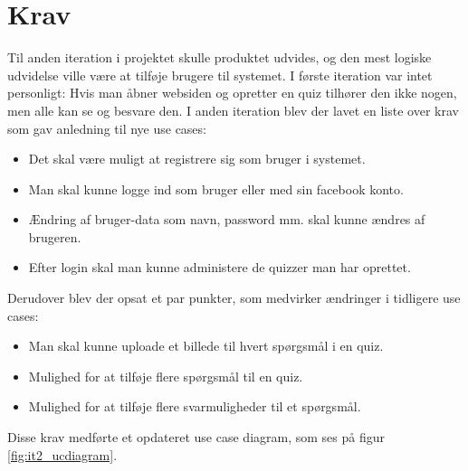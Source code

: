 \section{Krav}
Til anden iteration i projektet skulle produktet udvides, og den mest logiske udvidelse ville være at tilføje brugere til systemet. I første iteration var intet personligt: Hvis man åbner websiden og opretter en quiz tilhører den ikke nogen, men alle kan se og besvare den.
I anden iteration blev der lavet en liste over krav som gav anledning til nye use cases:
\begin{itemize}
\item Det skal være muligt at registrere sig som bruger i systemet.
\item Man skal kunne logge ind som bruger eller med sin facebook konto.
\item Ændring af bruger-data som navn, password mm. skal kunne ændres af brugeren.
\item Efter login skal man kunne administere de quizzer man har oprettet.
\end{itemize}

Derudover blev der opsat et par punkter, som medvirker ændringer i tidligere use cases:
\begin{itemize}
\item Man skal kunne uploade et billede til hvert spørgsmål i en quiz.
\item Mulighed for at tilføje flere spørgsmål til en quiz.
\item Mulighed for at tilføje flere svarmuligheder til et spørgsmål.
\end{itemize}

Disse krav medførte et opdateret use case diagram, som ses på figur \ref{fig:it2_ucdiagram}.

